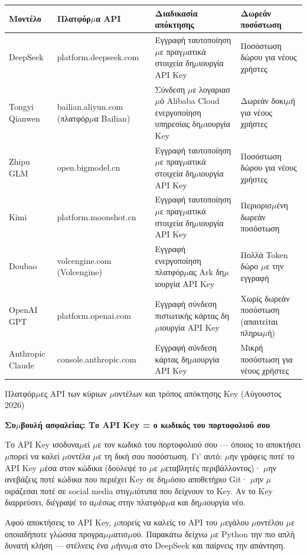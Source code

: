 \begin{center}
\begin{tabularx}{\linewidth}{|X|X|X|X|}
\hline
\textbf{Μοντέλο} & \textbf{Πλατφόρ$\mu$α API} & \textbf{Διαδικασία απόκτησης} & \textbf{Δωρεάν ποσόστωση} \tabularnewline
\hline
DeepSeek & platform.deepseek.com & Εγγραφή ταυτοποίηση $\mu$ε πραγ$\mu$ατικά στοιχεία δη$\mu$ιουργία API Key & Ποσόστωση δώρου για νέους χρήστες \tabularnewline
Tongyi Qianwen & bailian.aliyun.com (πλατφόρ$\mu$α Bailian) & Σύνδεση $\mu$ε λογαριασ$\mu$ό Alibaba Cloud ενεργοποίηση υπηρεσίας δη$\mu$ιουργία Key & Δωρεάν δοκι$\mu$ή για νέους χρήστες \tabularnewline
Zhipu GLM & open.bigmodel.cn & Εγγραφή ταυτοποίηση $\mu$ε πραγ$\mu$ατικά στοιχεία δη$\mu$ιουργία API Key & Ποσόστωση δώρου για νέους χρήστες \tabularnewline
Kimi & platform.moonshot.cn & Εγγραφή ταυτοποίηση $\mu$ε πραγ$\mu$ατικά στοιχεία δη$\mu$ιουργία API Key & Περιορισ$\mu$ένη δωρεάν ποσόστωση \tabularnewline
Doubao & volcengine.com (Volcengine) & Εγγραφή ενεργοποίηση πλατφόρ$\mu$ας Ark δη$\mu$ιουργία API Key & Πολλά Token δώρο $\mu$ε την εγγραφή \tabularnewline
OpenAI GPT & platform.openai.com & Εγγραφή σύνδεση πιστωτικής κάρτας δη$\mu$ιουργία API Key & Χωρίς δωρεάν ποσόστωση (απαιτείται πληρω$\mu$ή) \tabularnewline
Anthropic Claude & console.anthropic.com & Εγγραφή σύνδεση κάρτας δη$\mu$ιουργία API Key & Μικρή ποσόστωση για νέους χρήστες \tabularnewline
\hline
\end{tabularx}
\end{center}

\begin{center}\small\color{gray}Πλατφόρ$\mu$ες API των κύριων $\mu$οντέλων και τρόπος απόκτησης Key (Αύγουστος 2026)\end{center}

\textbf{Συ$\mu$βουλή ασφαλείας: Το API Key = ο κωδικός του πορτοφολιού σου}\par

Το API Key ισοδυνα$\mu$εί $\mu$ε τον κωδικό του πορτοφολιού σου — όποιος το αποκτήσει $\mu$πορεί να καλεί $\mu$οντέλα $\mu$ε τη δική σου ποσόστωση. Γι' αυτό: $\mu$ην γράφεις ποτέ το API Key $\mu$έσα στον κώδικα (δούλεψέ το $\mu$ε $\mu$εταβλητές περιβάλλοντος)· $\mu$ην ανεβάζεις ποτέ κώδικα που περιέχει Key σε δη$\mu$όσιο αποθετήριο Git· $\mu$ην $\mu$οιράζεσαι ποτέ σε social media στιγ$\mu$ιότυπα που δείχνουν το Key. Αν το Key διαρρεύσει, διέγραψέ το α$\mu$έσως στην πλατφόρ$\mu$α και δη$\mu$ιουργία νέο.


Αφού αποκτήσεις το API Key, $\mu$πορείς να καλείς το API του $\mu$εγάλου $\mu$οντέλου $\mu$ε οποιαδήποτε γλώσσα προγρα$\mu$$\mu$ατισ$\mu$ού. Παρακάτω δείχνω $\mu$ε Python την πιο απλή δυνατή κλήση — στέλνεις ένα $\mu$ήνυ$\mu$α στο DeepSeek και παίρνεις την απάντηση.

